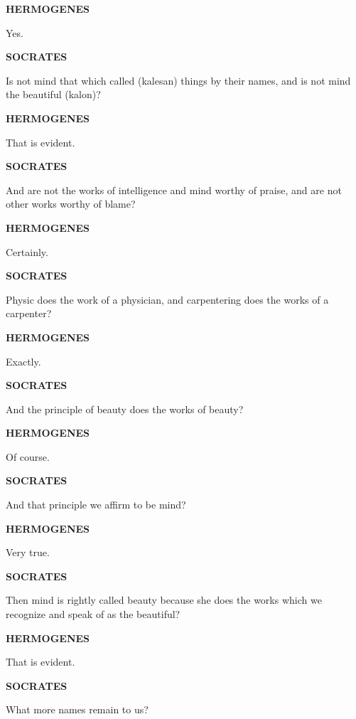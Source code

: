 \documentclass[11pt,letter]{article}
\begin{document}
\par \textbf{HERMOGENES}
\par   Yes.

\par \textbf{SOCRATES}
\par   Is not mind that which called (kalesan) things by their names, and is not mind the beautiful (kalon)?

\par \textbf{HERMOGENES}
\par   That is evident.

\par \textbf{SOCRATES}
\par   And are not the works of intelligence and mind worthy of praise, and are not other works worthy of blame?

\par \textbf{HERMOGENES}
\par   Certainly.

\par \textbf{SOCRATES}
\par   Physic does the work of a physician, and carpentering does the works of a carpenter?

\par \textbf{HERMOGENES}
\par   Exactly.

\par \textbf{SOCRATES}
\par   And the principle of beauty does the works of beauty?

\par \textbf{HERMOGENES}
\par   Of course.

\par \textbf{SOCRATES}
\par   And that principle we affirm to be mind?

\par \textbf{HERMOGENES}
\par   Very true.

\par \textbf{SOCRATES}
\par   Then mind is rightly called beauty because she does the works which we recognize and speak of as the beautiful?

\par \textbf{HERMOGENES}
\par   That is evident.

\par \textbf{SOCRATES}
\par   What more names remain to us?
\end{document}
